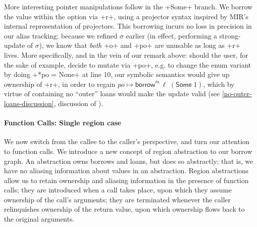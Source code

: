 \documentclass[acmsmall,screen]{acmart}
\newcommand{\Rule}[1]{\hyperlink{#1}{\TirName {#1}}}
\newcommand\kw[1]{\ensuremath{\mathsf{#1}}}
\newcommand\esome[1]{\kw{Some}\;#1}
\newcommand\emborrow[2]{\ensuremath{\mathsf{borrow}^m\,#1\;#2}}
\newcommand\myparagraph[1]{\emph{#1}.\ }
\let\myparagraph\paragraph
\begin{document}
More interesting pointer manipulations follow in the \li+Some+ branch. We borrow
the value within the option via \li+r+, using a projector syntax inspired by
MIR's internal representation of projectors.
This borrowing incurs no loss in precision in our
alias tracking: because we refined $\sigma$ earlier (in effect, performing a
strong-update of $\sigma$), we know that \emph{both} \li+o+ and \li+po+ are
unusable as long as \li+r+ lives.
More specifically, and in the vein of our remark above: should the user, for the
sake of example, decide to mutate via \li+po+, e.g. to change the enum variant
by doing \li+*po = None+ at line 10, our symbolic semantics would
give up ownership of \li+r+, in order to regain $po \mapsto
\emborrow\ell{(\esome1)}$, which by virtue of containing no ``outer'' loans
would make the update valid (see
\ref{no-outer-loans-discussion}, discussion of \Rule{E-Assign}).

\myparagraph{Function Calls: Single region case}
We now switch from the callee to the caller's perspective, and turn our
attention to function calls. We introduce a new concept of region abstraction to our borrow graph. An
abstraction owns borrows and loans, but does so abstractly; that is, we have
no aliasing information about values in an abstraction. Region abstractions
allow us to retain ownership and aliasing information in the presence of
function calls; they are introduced when a call takes place, upon which
they assume ownership of the call's arguments; they are
terminated whenever the caller relinquishes ownership of the return value, upon
which ownership flows back to the original arguments.
\end{document}
